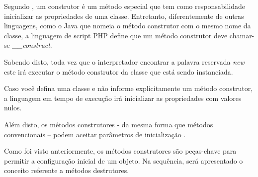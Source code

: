 Segundo , um construtor é um método especial que tem
como responsabilidade inicializar as propriedades de uma classe. Entretanto,
diferentemente de outras linguagens, como o Java que nomeia o método
construtor com o mesmo nome da classe, a linguagem de script \acs{PHP} define que um
método construtor deve chamar-se \textit{\_\_construct}.

Sabendo disto, toda vez que o interpretador encontrar a palavra reservada
\textit{new} este irá executar o método construtor da classe que está sendo
instanciada.

Caso você defina uma classe e não informe explicitamente um método construtor, a
linguagem em tempo de execução irá inicializar as propriedades com valores nulos.

Além disto, os métodos construtores - da mesma forma que métodos convencionais –
podem aceitar parâmetros de inicialização \cite{learningJava}.

Como foi visto anteriormente, os métodos construtores são peças-chave para
permitir a configuração inicial de um objeto. Na sequência, será apresentado o
conceito referente a métodos destrutores.
